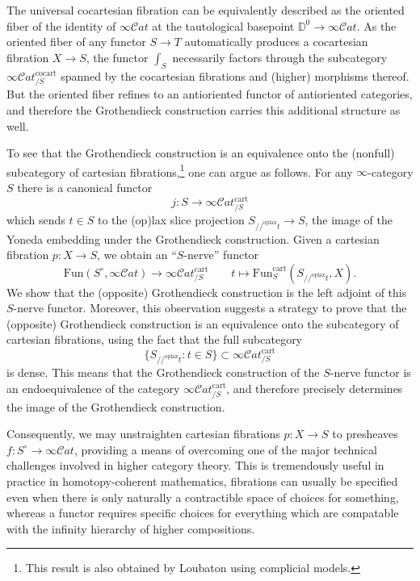 \documentclass[10pt,oneside]{article}
\numberwithin{equation}{section} %
\numberwithin{figure}{section} %
\theoremstyle{plain}
\theoremstyle{definition}
\newcommand{\bD}{{\mathbb D}}
\newcommand{\Fun}{\mathrm{Fun}}
\newcommand{\cocart}{{\mathrm{cocart}}}
\newcommand{\cart}{{\mathrm{cart}}}
\newcommand{\oplax}{{\mathrm{oplax}}}
\newcommand{\scat}{\mathcal{C}\mathit{at}}
\begin{document}
The universal cocartesian fibration can be equivalently described as the oriented fiber of the identity of $\infty\scat$ at the tautological basepoint $\bD^0\to\infty\scat$.
As the oriented fiber of any functor $S\to T$ automatically produces a cocartesian fibration $X\to S$, the functor $\int_S$ necessarily factors through the subcategory $\infty\scat_{/S}^{\cocart}$ spanned by the cocartesian fibrations and (higher) morphisms thereof.
But the oriented fiber refines to an antioriented functor of antioriented categories, and therefore the Grothendieck construction carries this additional structure as well.

To see that the Grothendieck construction is an equivalence onto the (nonfull) subcategory of cartesian fibrations,\footnote{This result is also obtained by Loubaton \cite{loubaton2024categorical} using complicial models.}
one can argue as follows.
For any $\infty$-category $S$ there is a canonical functor
\[
j:S\to \infty\scat^{\cart}_{/S}
\]
which sends $t\in S$ to the (op)lax slice projection $S_{//^\oplax t}\to S$, the image of the Yoneda embedding under the Grothendieck construction.
Given a cartesian fibration $p:X\to S$, we obtain an ``$S$-nerve'' functor
\[
\Fun(S^{\circ},\infty\scat)\to \infty\scat^{\cart}_{/S}\qquad t\mapsto\Fun^\cart_S(S_{//^\oplax t},X).
\]
We show that the (opposite) Grothendieck construction is the left adjoint of this $S$-nerve functor.
Moreover, this observation suggests a strategy to prove that the (opposite) Grothendieck construction is an equivalence onto the subcategory of cartesian fibrations, using the fact that the full subcategory
\[
\{S_{//^\oplax t}:t\in S\}\subset\infty\scat^{\cart}_{/S}
\]
is dense.
This means that the Grothendieck construction of the $S$-nerve functor is an endoequivalence of the category $\infty\scat^{\cart}_{/S}$, and therefore precisely determines the image of the Grothendieck construction.

Consequently, we may unstraighten cartesian fibrations $p:X\to S$ to presheaves $f:S^{\circ}\to\infty\scat$, providing a means of overcoming one of the major technical challenges involved in higher category theory.
This is tremendously useful in practice in homotopy-coherent mathematics, fibrations can usually be specified even when there is only naturally a contractible space of choices for something, whereas a functor requires specific choices for everything which are compatable with the infinity hierarchy of higher compositions.
\end{document}
